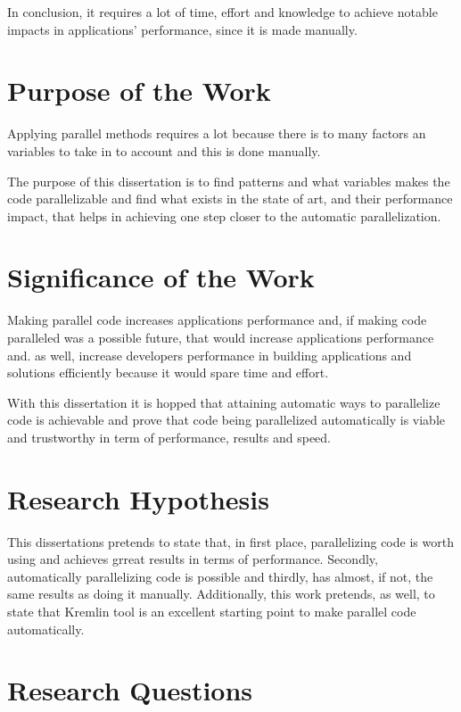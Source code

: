 In conclusion, it requires a lot of time, effort and knowledge to achieve notable impacts in applications' performance, since it is made manually.


\section{Purpose of the Work}

Applying parallel methods requires a lot because there is to many factors an variables to take in to account and this is done manually.

The purpose of this dissertation is to find patterns and what  variables makes the code parallelizable  and find what exists in the state of art, and their performance impact, that helps in achieving one step closer to the automatic parallelization. 

\section{Significance of the Work}

Making parallel code increases applications performance and, if making code paralleled  was a possible future, that would increase applications performance and. as well, increase developers performance in building applications and solutions efficiently because it would spare time and effort.

With this dissertation it is hopped that attaining automatic ways to parallelize code is achievable and prove that code being parallelized automatically is viable and trustworthy in term of performance, results and speed.


\section{Research Hypothesis}

This dissertations pretends to state that, in first place, parallelizing code is worth using and achieves grreat results in terms of performance. Secondly, automatically parallelizing code is possible and thirdly, has almost, if not, the same results as doing it manually. Additionally, this work pretends, as well, to state that Kremlin tool is an excellent starting point to make parallel code automatically. 

\section{Research Questions}

